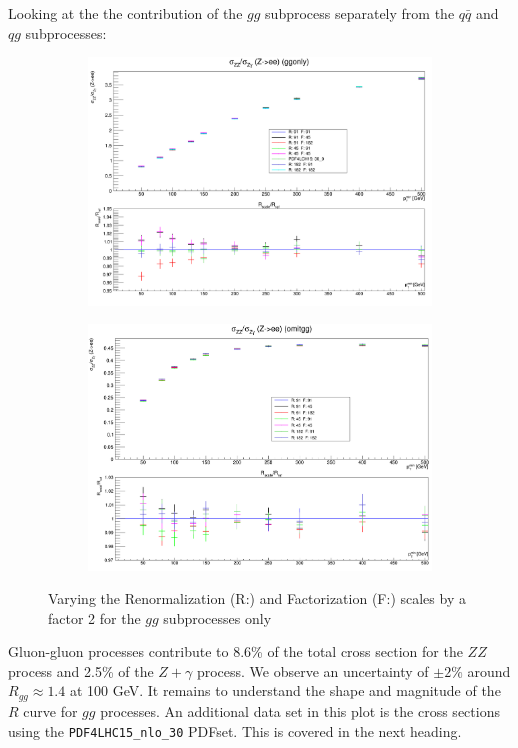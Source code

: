 \documentclass[11pt,a4paper,final]{report}
\begin{document}
Looking at the the contribution of the $gg$ subprocess separately from the $q\bar{q}$ and $qg$ subprocesses:
\begin{figure}[H]
\centering
	\begin{subfigure}{0.49\textwidth}
		\centering
		\includegraphics[width=\linewidth]{scale/ggonly_nlo_scale_overlay.png}
	\end{subfigure}
	
	\begin{subfigure}{0.49\textwidth}
		\centering
		\includegraphics[width=\linewidth]{scale/omitgg_nlo_scale_overlay.png}
	\end{subfigure}	
\caption{Varying the Renormalization (R:) and Factorization (F:) scales by a factor 2 for the $gg$ subprocesses only}
\end{figure}
Gluon-gluon processes contribute to 8.6\% of the total cross section for the $ZZ$ process and 2.5\% of the $Z+\gamma$ process. We observe an uncertainty of $\pm 2\%$ around $R_{gg} \approx 1.4$ at 100 GeV. It remains to understand the shape and magnitude of the $R$ curve for $gg$ processes. An additional data set in this plot is the cross sections using the \texttt{PDF4LHC15\_nlo\_30} PDFset. This is covered in the next heading.
\end{document}
